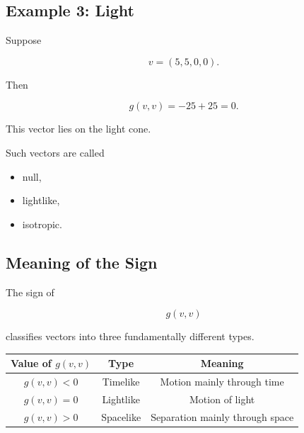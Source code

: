 \documentclass[12pt,a4paper]{article}
\theoremstyle{notespace}
\begin{document}

\subsection{Example 3: Light}

Suppose

\[
v=(5,5,0,0).
\]

Then

\[
g(v,v)
=
-25+25
=
0.
\]

This vector lies on the light cone.

Such vectors are called

\begin{itemize}
	\item null,
	\item lightlike,
	\item isotropic.
\end{itemize}


\subsection{Meaning of the Sign}

The sign of

\[
g(v,v)
\]

classifies vectors into three fundamentally different types.

\bigskip

\begin{center}
	\renewcommand{\arraystretch}{1.4}
	\begin{tabular}{|c|c|c|}
		\hline
		Value of $g(v,v)$ &
		Type &
		Meaning
		\\
		\hline
		
		$g(v,v)<0$
		&
		Timelike
		&
		Motion mainly through time
		\\
		\hline
		
		$g(v,v)=0$
		&
		Lightlike
		&
		Motion of light
		\\
		\hline
		
		$g(v,v)>0$
		&
		Spacelike
		&
		Separation mainly through space
		\\
		\hline
		
	\end{tabular}
\end{center}

\end{document}
